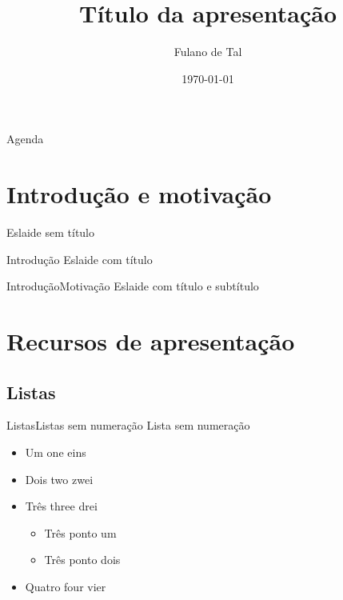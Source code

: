 \documentclass[
	brazilian, %
	12pt, %
	aspectratio = 169, %
]{beamer}
\title{Título da apresentação}
\author{Fulano de Tal}
\date{\today} %
\begin{document}
\begin{frame}
	\titlepage	
\end{frame}

\begin{frame}{Agenda}
	\tableofcontents
\end{frame}


%

\section{Introdução e motivação}
\begin{frame}
	Eslaide sem título
\end{frame}

\begin{frame}{Introdução}
	Eslaide com título
\end{frame}

\begin{frame}{Introdução}{Motivação}
	Eslaide com título e subtítulo
\end{frame}


\section[Recursos]{Recursos de apresentação}

\subsection{Listas}

\begin{frame}{Listas}{Listas sem numeração}
	Lista sem numeração
	
	\begin{itemize}
		\item Um one eins
		\item Dois two zwei
		\item Três three drei
			\begin{itemize}
				\item Três ponto um
				\item Três ponto dois
			\end{itemize}
		\item Quatro four vier
	\end{itemize}
\end{frame}
\end{document}
